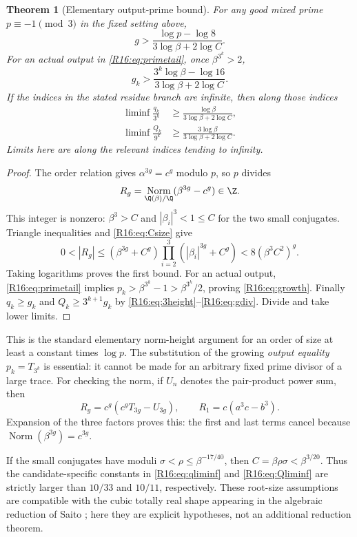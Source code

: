 \documentclass[11pt,a4paper]{article}
\newtheorem{theorem}{Theorem}[section]
\theoremstyle{definition}\newtheorem{definition}[theorem]{Definition}
\theoremstyle{remark}\newtheorem{remark}[theorem]{Remark}
\DeclareMathOperator{\Norm}{Norm}\DeclareMathOperator{\ord}{ord}\DeclareMathOperator{\Gal}{Gal}
\begin{document}
\begin{theorem}[Elementary output-prime bound]\label{R16:thm:norm}
For any good mixed prime $p\equiv-1\pmod3$ in the fixed setting above,
\[
 g>\frac{\log p-\log8}{3\log\beta+2\log C}.
\]
For an actual output in \eqref{R16:eq:primetail}, once $\beta^{3^k}>2$,
\begin{equation}\label{R16:eq:growth}
 g_k>\frac{3^k\log\beta-\log16}{3\log\beta+2\log C}.
\end{equation}
If the indices in the stated residue branch are infinite, then along
those indices
\begin{align}
 \liminf\frac{q_k}{3^k}&\ge
 \frac{\log\beta}{3\log\beta+2\log C},\label{R16:eq:qliminf}\\
 \liminf\frac{Q_k}{9^k}&\ge
 \frac{3\log\beta}{3\log\beta+2\log C}.\label{R16:eq:Qliminf}
\end{align}
Limits here are along the relevant indices tending to infinity.
\end{theorem}
\begin{proof}
The order relation gives $\alpha^{3g}=c^g$ modulo $p$, so $p$ divides
\[
 R_g=\Norm_{\Q(\beta)/\Q}(\beta^{3g}-c^g)\in\Z.
\]
This integer is nonzero: $\beta^3>C$ and
$|\beta_i|^3<1\le C$ for the two small conjugates. Triangle inequalities
and \eqref{R16:eq:Csize} give
\[
 0<|R_g|\le(\beta^{3g}+C^g)
 \prod_{i=2}^3(|\beta_i|^{3g}+C^g)
 <8(\beta^3C^2)^g.
\]
Taking logarithms proves the first bound. For an actual output,
\eqref{R16:eq:primetail} implies
$p_k>\beta^{3^k}-1>\beta^{3^k}/2$, proving \eqref{R16:eq:growth}.
Finally $q_k\ge g_k$ and $Q_k\ge3^{k+1}g_k$ by
\eqref{R16:eq:3height}--\eqref{R16:eq:gdiv}. Divide and take lower limits.
\end{proof}

This is the standard elementary norm-height argument for an order of size
at least a constant times $\log p$. The substitution of the growing
\emph{output equality} $p_k=T_{3^k}$ is essential: it cannot be made for
an arbitrary fixed prime divisor of a large trace.
For checking the norm, if $U_n$ denotes the pair-product power sum, then
\begin{equation}\label{R16:eq:normidentity}
 R_g=c^g(c^gT_{3g}-U_{3g}),\qquad R_1=c(a^3c-b^3).
\end{equation}
Expansion of the three factors proves this: the first and last terms
cancel because $\Norm(\beta^{3g})=c^{3g}$.

If the small conjugates have moduli $\sigma<\rho\le\beta^{-17/40}$,
then $C=\beta\rho\sigma<\beta^{3/20}$. Thus the candidate-specific
constants in \eqref{R16:eq:qliminf} and \eqref{R16:eq:Qliminf} are strictly larger
than $10/33$ and $10/11$, respectively. These root-size assumptions are
compatible with the cubic totally real shape appearing in the algebraic
reduction of Saito \cite[Theorem 1.7]{Saito}; here they are explicit
hypotheses, not an additional reduction theorem.
\end{document}
